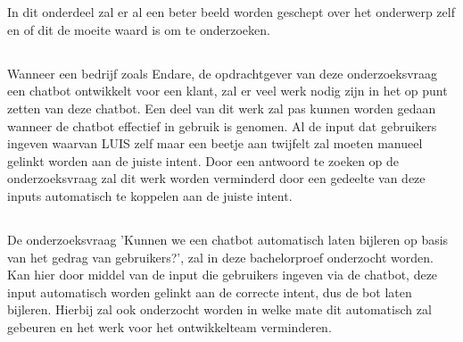
\chapter{}
\label{ch:inleiding}

In dit onderdeel zal er al een beter beeld worden geschept over het onderwerp zelf en of dit de moeite waard is om te onderzoeken.

\section{}
\label{sec:probleemstelling}

Wanneer een bedrijf zoals Endare, de opdrachtgever van deze onderzoeksvraag een chatbot ontwikkelt voor een klant, zal er veel werk nodig zijn in het op punt zetten van deze chatbot. Een deel van dit werk zal pas kunnen worden gedaan wanneer de chatbot effectief in gebruik is genomen. Al de input dat gebruikers ingeven waarvan LUIS zelf maar een beetje aan twijfelt zal moeten manueel gelinkt worden aan de juiste intent. Door een antwoord te zoeken op de onderzoeksvraag zal dit werk worden verminderd door een gedeelte van deze inputs automatisch te koppelen aan de juiste intent.

\section{}
\label{sec:onderzoeksvraag}

De onderzoeksvraag 'Kunnen we een chatbot automatisch laten bijleren op basis van het gedrag van gebruikers?', zal in deze bachelorproef onderzocht worden. Kan hier door middel van de input die gebruikers ingeven via de chatbot, deze input automatisch worden gelinkt aan de correcte intent, dus de bot laten bijleren. Hierbij zal ook onderzocht worden in welke mate dit automatisch zal gebeuren en het werk voor het ontwikkelteam verminderen.

\section{}
\label{sec:onderzoeksdoelstelling}

